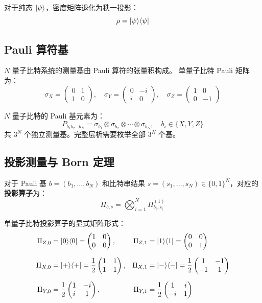 \documentclass[12pt, a4paper]{article}
\begin{document}
对于纯态 $\ket{\psi}$，密度矩阵退化为秩一投影：
\[
    \rho = \ket{\psi}\!\bra{\psi}
\]

\subsection{Pauli 算符基}

$N$ 量子比特系统的测量基由 Pauli 算符的张量积构成。
单量子比特 Pauli 矩阵为：
\[
    \sigma_X = \begin{pmatrix}0 & 1 \\ 1 & 0\end{pmatrix},\quad
    \sigma_Y = \begin{pmatrix}0 & -i \\ i & 0\end{pmatrix},\quad
    \sigma_Z = \begin{pmatrix}1 & 0 \\ 0 & -1\end{pmatrix}
\]

$N$ 量子比特的 Pauli 基元素为：
\[
    P_{b_1 b_2 \cdots b_N}
    = \sigma_{b_1} \otimes \sigma_{b_2} \otimes \cdots \otimes \sigma_{b_N},
    \quad b_i \in \{X, Y, Z\}
\]
共 $3^N$ 个独立测量基。完整层析需要枚举全部 $3^N$ 个基。

\subsection{投影测量与 Born 定理}

对于 Pauli 基 $b = (b_1, \ldots, b_N)$ 和比特串结果
$s = (s_1, \ldots, s_N) \in \{0,1\}^N$，对应的\textbf{投影算子}为：
\[
    \Pi_{b,s} = \bigotimes_{i=1}^{N} \Pi_{b_i, s_i}^{(1)}
\]

单量子比特投影算子的显式矩阵形式：
\begin{align}
    \Pi_{Z,0} &= \ket{0}\!\bra{0} = \begin{pmatrix}1&0\\0&0\end{pmatrix},&
    \Pi_{Z,1} &= \ket{1}\!\bra{1} = \begin{pmatrix}0&0\\0&1\end{pmatrix}
    \\[6pt]
    \Pi_{X,0} &= \ket{+}\!\bra{+} = \frac{1}{2}\begin{pmatrix}1&1\\1&1\end{pmatrix},&
    \Pi_{X,1} &= \ket{-}\!\bra{-} = \frac{1}{2}\begin{pmatrix}1&-1\\-1&1\end{pmatrix}
    \\[6pt]
    \Pi_{Y,0} &= \frac{1}{2}\begin{pmatrix}1&-i\\i&1\end{pmatrix},&
    \Pi_{Y,1} &= \frac{1}{2}\begin{pmatrix}1&i\\-i&1\end{pmatrix}
\end{align}
\end{document}
